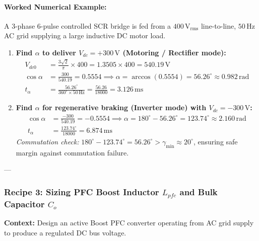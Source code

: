 \paragraph{Worked Numerical Example:}
A 3-phase 6-pulse controlled SCR bridge is fed from a $400\,\si{\volt}_{\mathrm{rms}}$ line-to-line, $50\,\si{\hertz}$ AC grid supplying a large inductive DC motor load.
\begin{enumerate}
  \item[(a)] \textbf{Find $\alpha$ to deliver $V_{dc} = +300\,\si{\volt}$ (Motoring / Rectifier mode):}
  \begin{align*}
  V_{dc0} &= \frac{3\sqrt{2}}{\pi} \times 400 = 1.3505 \times 400 = 540.19\,\si{\volt} \\
  \cos\alpha &= \frac{300}{540.19} = 0.5554 \implies \alpha = \arccos(0.5554) = 56.26^\circ \approx 0.982\,\si{\radian} \\
  t_\alpha &= \frac{56.26^\circ}{360^\circ \times 50\,\si{\hertz}} = \frac{56.26}{18000} = 3.126\,\si{\milli\second}
  \end{align*}
  \item[(b)] \textbf{Find $\alpha$ for regenerative braking (Inverter mode) with $V_{dc} = -300\,\si{\volt}$:}
  \begin{align*}
  \cos\alpha &= \frac{-300}{540.19} = -0.5554 \implies \alpha = 180^\circ - 56.26^\circ = 123.74^\circ \approx 2.160\,\si{\radian} \\
  t_\alpha &= \frac{123.74^\circ}{18000} = 6.874\,\si{\milli\second}
  \end{align*}
  \textit{Commutation check:} $180^\circ - 123.74^\circ = 56.26^\circ > \gamma_{\min} \approx 20^\circ$, ensuring safe margin against commutation failure.
\end{enumerate}

---

\subsubsection{Recipe 3: Sizing PFC Boost Inductor $L_{pfc}$ and Bulk Capacitor $C_o$}
\noindent\textbf{Context:} Design an active Boost PFC converter operating from AC grid supply to produce a regulated DC bus voltage.

